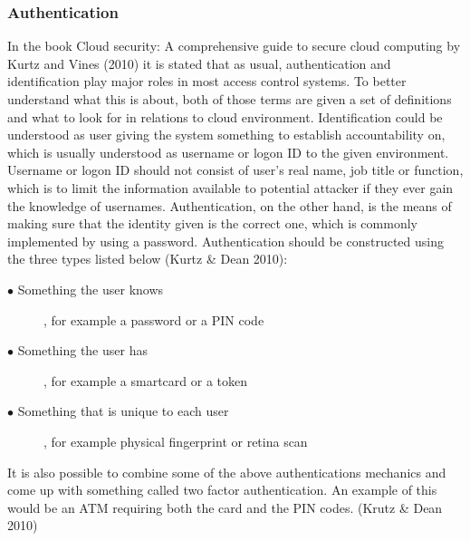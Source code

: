 \documentclass{article}
\begin{document}
\subsubsection{Authentication}
In the book Cloud security: A comprehensive guide to secure cloud computing by Kurtz and Vines (2010) it is stated that as usual, authentication and identification play major roles in most access control systems. To better understand what this is about, both of those terms are given a set of definitions and what to look for in relations to cloud environment.
Identification could be understood as user giving the system something to establish accountability on, which is usually understood as username or logon ID to the given environment. Username or logon ID should not consist of user's real name, job title or function, which is to limit the information available to potential attacker if they ever gain the knowledge of usernames. Authentication, on the other hand, is the means of making sure that the identity given is the correct one, which is commonly implemented by using a password. Authentication should be constructed using the three types listed below (Kurtz \& Dean 2010):
\begin{description}
        \item[$\bullet$ Something the user knows], for example a password or a PIN code
        \item[$\bullet$ Something the user has], for example a smartcard or a token
        \item[$\bullet$ Something that is unique to each user], for example physical fingerprint or retina scan
\end{description}
It is also possible to combine some of the above authentications mechanics and come up with something called two factor authentication. An example of this would be an ATM requiring both the card and the PIN codes. (Krutz \& Dean 2010)
\end{document}
